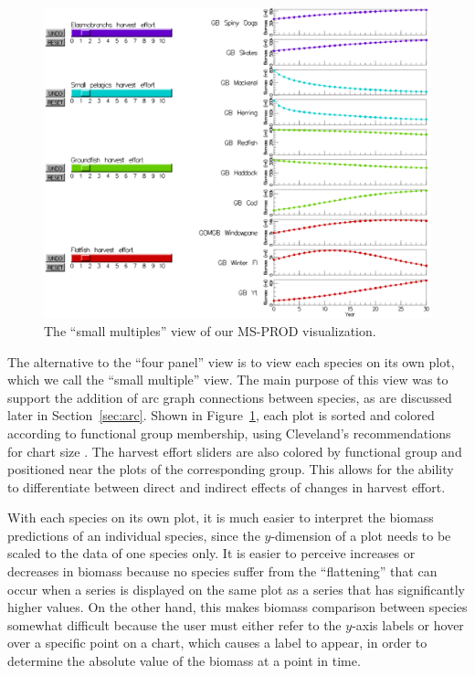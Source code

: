 \begin{figure}[h]
	\centering
	\includegraphics[width=12cm]{figures/eps/msprod_species.eps}
	\caption{The ``small multiples'' view of our MS-PROD visualization.}
	\label{fig:msprod_species}
\end{figure}

The alternative to the ``four panel'' view is to view each species on its own plot, which we call the ``small multiple'' view.  The main purpose of this view was to support the addition of arc graph connections between species, as are discussed later in Section~\ref{sec:arc}. Shown in Figure~\ref{fig:msprod_species}, each plot is sorted and colored according to functional group membership, using Cleveland's recommendations for chart size \cite{cleveland1988}.  The harvest effort sliders are also colored by functional group and positioned near the plots of the corresponding group.  This allows for the ability to differentiate between direct and indirect effects of changes in harvest effort.

With each species on its own plot, it is much easier to interpret the biomass predictions of an individual species, since the $y$-dimension of a plot needs to be scaled to the data of one species only.  It is easier to perceive increases or decreases in biomass because no species suffer from the ``flattening'' that can occur when a series is displayed on the same plot as a series that has significantly higher values.  On the other hand, this makes biomass comparison between species somewhat difficult because the user must either refer to the $y$-axis labels or hover over a specific point on a chart, which causes a label to appear, in order to determine the absolute value of the biomass at a point in time.

